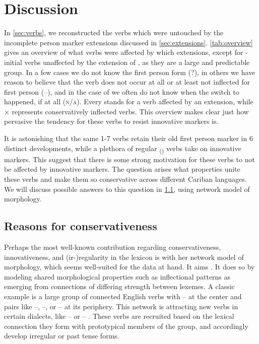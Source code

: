 \section{Discussion}
\label{sec:discussion}
In \cref{sec:verbs}, we reconstructed the verbs which were untouched by the incomplete person marker extensions discussed in \cref{sec:extensions}.
\cref{tab:overview} gives an overview of what verbs were affected by which extensions, except for -initial \akuriyo verbs unaffected by the extension of , as they are a large and predictable group.
In a few cases we do not know the first person form (?), in others we have reason to believe that the verb does not occur at all or at least not inflected for first person (–), and in the case of  we often do not know when the switch to  happened, if at all (\textsc{n/a}).
Every \checkmark stands for a verb affected by an extension, while × represents conservatively inflected verbs.
This overview makes clear just how pervasive the tendency for these verbs to resist innovative markers is.



It is astonishing that the same 1-7 verbs retain their old first person marker in 6 distinct developments, while a plethora of regular \textsubscript{()} verbs take on innovative markers.
This suggest that there is some strong motivation for these verbs to not be affected by innovative markers.
The question arises what properties unite these verbs and make them so conservative across different Cariban languages.
We will discuss possible answers to this question in \cref{sec:motivations}, using  network model of morphology.

\subsection{Reasons for conservativeness}
\label{sec:motivations}
Perhaps the most well-known contribution regarding conservativeness, innovativeness, and (ir-){}re\-gu\-la\-ri\-ty in the lexicon is \textcite{bybee1985morphology} with her network model of morphology, which seems well-suited for the data at hand.
It aims  \parencite[428]{bybee1995regular}.
It does so by modeling shared morphological properties such as inflectional patterns as emerging from connections of differing strength between lexemes.
A classic example is a large group of connected  English verbs with -- at the center and pairs like --, --, or -- at its periphery.
This network is attracting new verbs in certain dialects, like -- or -- \parencite[129--130]{bybee1985morphology}.
These verbs are recruited based on the lexical connection they form with prototypical members of the group, and accordingly develop irregular or  past tense forms.

